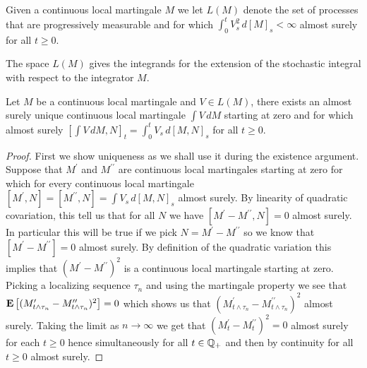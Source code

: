 \begin{defn}Given a continuous local martingale $M$ we let $L(M)$ denote the set of processes that are progressively measurable and for which $\int_0^t V^2_s \, d[M]_s < \infty$ almost surely for all $t \geq 0$.
\end{defn}
The space $L(M)$ gives the integrands for the extension of the stochastic integral with respect to the integrator $M$.
\begin{thm}\label{StochasticIntegralContinuousLocalMartingaleIntegrator}Let $M$ be a continuous local martingale and $V \in L(M)$, there exists an almost surely unique continuous local martingale $\int V \, dM$ starting at zero and for which almost surely
$[\int V \, dM, N]_t = \int_0^t V_s \, d[M,N]_s$ for all $t \geq 0$.
\end{thm}
\begin{proof}
First we show uniqueness as we shall use it during the existence argument.  Suppose that $M^\prime$ and $M^{\prime \prime}$ are continuous local martingales starting at zero for which for every continuous local martingale $[M^\prime, N] = [M^{\prime \prime},N] = \int V_s \, d[M,N]_s$ almost surely.  By linearity of quadratic covariation, this tell us that for all $N$ we have $[M^{\prime} - M^{\prime \prime} ,N]=0$ almost surely.  In particular this will be true if we pick $N = M^{\prime} - M^{\prime \prime}$ so we know that $[M^{\prime} - M^{\prime \prime}] = 0$ almost surely.  By definition of the quadratic variation this implies that $(M^{\prime} - M^{\prime \prime})^2$ is a continuous local martingale starting at zero.  Picking a localizing sequence $\tau_n$ and using the martingale property we see that $\textbf{E}\left[(M_{t \wedge \tau_n}^{\prime} - M_{t \wedge \tau_n}^{\prime \prime})^2\right] =0$ which shows us that $(M_{t \wedge \tau_n}^{\prime} - M_{t \wedge \tau_n}^{\prime \prime})^2$ almost surely.  Taking the limit as $n \to \infty$ we get that $(M_{t}^{\prime} - M_{t}^{\prime \prime})^2=0$ almost surely for each $t \geq 0$ hence simultaneously for all $t \in \mathbb{Q}_+$ and then by continuity for all $t \geq 0$ almost surely.


\end{proof}
